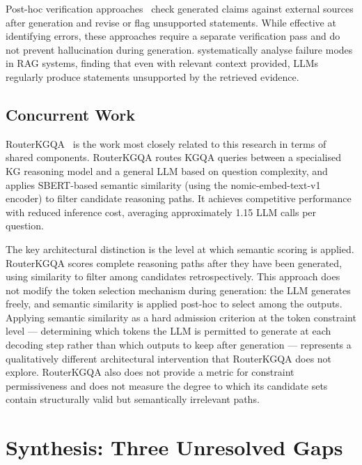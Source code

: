 Post-hoc verification approaches~\citep{nakano2021webgpt, gao2023rarr} check generated claims against external sources after generation and revise or flag unsupported statements. While effective at identifying errors, these approaches require a separate verification pass and do not prevent hallucination during generation. \citet{agrawal2024mindful} systematically analyse failure modes in RAG systems, finding that even with relevant context provided, LLMs regularly produce statements unsupported by the retrieved evidence.

\subsection{Concurrent Work}

RouterKGQA~\citep{yuan2026routerkgqa} is the work most closely related to this research in terms of shared components. RouterKGQA routes KGQA queries between a specialised KG reasoning model and a general LLM based on question complexity, and applies SBERT-based semantic similarity (using the nomic-embed-text-v1 encoder) to filter candidate reasoning paths. It achieves competitive performance with reduced inference cost, averaging approximately 1.15 LLM calls per question.

The key architectural distinction is the level at which semantic scoring is applied. RouterKGQA scores complete reasoning paths after they have been generated, using similarity to filter among candidates retrospectively. This approach does not modify the token selection mechanism during generation: the LLM generates freely, and semantic similarity is applied post-hoc to select among the outputs. Applying semantic similarity as a hard admission criterion at the token constraint level — determining which tokens the LLM is permitted to generate at each decoding step rather than which outputs to keep after generation — represents a qualitatively different architectural intervention that RouterKGQA does not explore. RouterKGQA also does not provide a metric for constraint permissiveness and does not measure the degree to which its candidate sets contain structurally valid but semantically irrelevant paths.

\section{Synthesis: Three Unresolved Gaps}
\label{sec:synthesis}

